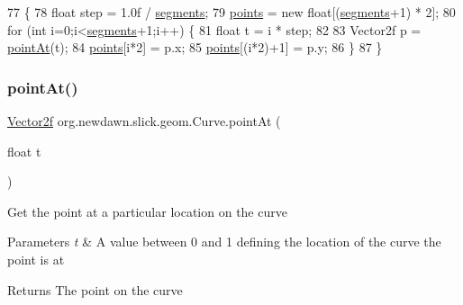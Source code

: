 \begin{DoxyCode}
77                                   \{
78         \textcolor{keywordtype}{float} step = 1.0f / \mbox{\hyperlink{classorg_1_1newdawn_1_1slick_1_1geom_1_1_curve_aafd4d13898e228efd7a871e5755bfb02}{segments}};
79         \mbox{\hyperlink{classorg_1_1newdawn_1_1slick_1_1geom_1_1_shape_a8b4d4058734bbb3b96072e470b92aa37}{points}} = \textcolor{keyword}{new} \textcolor{keywordtype}{float}[(\mbox{\hyperlink{classorg_1_1newdawn_1_1slick_1_1geom_1_1_curve_aafd4d13898e228efd7a871e5755bfb02}{segments}}+1) * 2];
80         \textcolor{keywordflow}{for} (\textcolor{keywordtype}{int} i=0;i<\mbox{\hyperlink{classorg_1_1newdawn_1_1slick_1_1geom_1_1_curve_aafd4d13898e228efd7a871e5755bfb02}{segments}}+1;i++) \{
81             \textcolor{keywordtype}{float} t = i * step;
82         
83             Vector2f p = \mbox{\hyperlink{classorg_1_1newdawn_1_1slick_1_1geom_1_1_curve_a5c097e219e29b5e4aed2a22b18036b70}{pointAt}}(t);
84             \mbox{\hyperlink{classorg_1_1newdawn_1_1slick_1_1geom_1_1_shape_a8b4d4058734bbb3b96072e470b92aa37}{points}}[i*2] = p.x;
85             \mbox{\hyperlink{classorg_1_1newdawn_1_1slick_1_1geom_1_1_shape_a8b4d4058734bbb3b96072e470b92aa37}{points}}[(i*2)+1] = p.y;
86         \}
87     \}
\end{DoxyCode}
\mbox{\label{classorg_1_1newdawn_1_1slick_1_1geom_1_1_curve_a5c097e219e29b5e4aed2a22b18036b70}} 
\subsubsection{\texorpdfstring{point\+At()}{pointAt()}}
{\footnotesize\ttfamily \mbox{\hyperlink{classorg_1_1newdawn_1_1slick_1_1geom_1_1_vector2f}{Vector2f}} org.\+newdawn.\+slick.\+geom.\+Curve.\+point\+At (\begin{DoxyParamCaption}\item[{float}]{t }\end{DoxyParamCaption})\hspace{0.3cm}{\ttfamily [inline]}}

Get the point at a particular location on the curve


\begin{DoxyParams}{Parameters}
{\em t} & A value between 0 and 1 defining the location of the curve the point is at \\
\hline
\end{DoxyParams}
\begin{DoxyReturn}{Returns}
The point on the curve 
\end{DoxyReturn}

